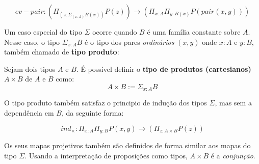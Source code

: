 \documentclass[../main.tex]{subfiles}
\begin{document}
$$ev-pair : (\Pi_{(z : \Sigma_{(x : A)}B(x))} P(z)) \to (\Pi_{x : A}\Pi_{y : B(x)}P(pair(x, y)))$$

Um caso especial do tipo $\Sigma$ ocorre quando $B$ é uma família constante sobre $A$. Nesse caso, o tipo $\Sigma_{x : A} B$ é o tipo dos pares \emph{ordinários} $(x, y)$ onde $x : A$ e $y : B$, também chamado de \textbf{tipo produto}:

\begin{definition}
    Sejam dois tipos $A$ e $B$. É possível definir o \textbf{tipo de produtos (cartesianos)} $A \times B$ de $A$ e $B$ como:
    $$A \times B := \Sigma_{x : A} B$$
\end{definition}

O tipo produto também satisfaz o principio de indução dos tipos $\Sigma$, mas sem a dependência em $B$, da seguinte forma:

$$ind_{\times} : \Pi_{x : A}\Pi_{y : B}P(x, y) \to (\Pi_{z : A \times B} P(z))$$

Os seus mapas projetivos também são definidos de forma similar aos mapas do tipo $\Sigma$. Usando a interpretação de proposições como tipos, $A \times B$ é a \emph{conjunção}.
\end{document}
